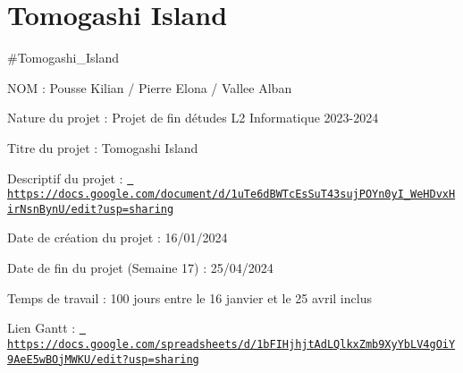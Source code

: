 \chapter{Tomogashi Island}
\hypertarget{index}{}\label{index}
\label{index_md_README}%
%
 \#\+Tomogashi\+\_\+\+Island

NOM \+: Pousse Kilian / Pierre Elona / Vallee Alban

Nature du projet \+: Projet de fin d\textquotesingle{}études L2 Informatique 2023-\/2024

Titre du projet \+: Tomogashi Island

Descriptif du projet \+: \href{https://docs.google.com/document/d/1uTe6dBWTcEsSuT43sujPOYn0yI_WeHDvxHirNsnBynU/edit?usp=sharing}{\texttt{ https\+://docs.\+google.\+com/document/d/1u\+Te6d\+BWTc\+Es\+Su\+T43suj\+POYn0y\+I\+\_\+\+We\+HDvx\+Hir\+Nsn\+Byn\+U/edit?usp=sharing}}

Date de création du projet \+: 16/01/2024

Date de fin du projet (Semaine 17) \+: 25/04/2024

Temps de travail \+: 100 jours entre le 16 janvier et le 25 avril inclus

Lien Gantt \+: \href{https://docs.google.com/spreadsheets/d/1bFIHjhjtAdLQlkxZmb9XyYbLV4gOiY9AeE5wBOjMWKU/edit?usp=sharing}{\texttt{ https\+://docs.\+google.\+com/spreadsheets/d/1b\+FIHjhjt\+Ad\+LQlkx\+Zmb9\+Xy\+Yb\+LV4g\+Oi\+Y9\+Ae\+E5w\+BOj\+MWKU/edit?usp=sharing}} 
